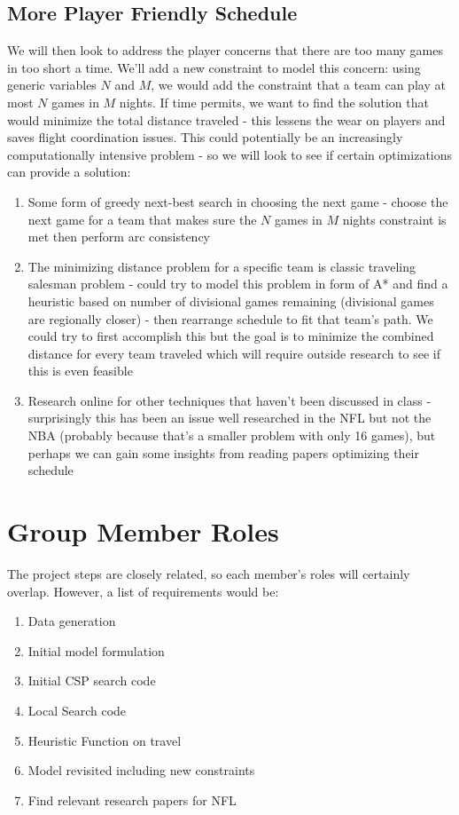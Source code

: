 \documentclass{article}
\begin{document}
	\subsection{More Player Friendly Schedule}
	We will then look to address the player concerns that there are too many games in too short a time. We'll add a new constraint to model this concern: using generic variables $N$ and $M$, we would add the constraint that a team can play at most $N$ games in $M$ nights.  If time permits, we want to find the solution that would minimize the total distance traveled - this lessens the wear on players and saves flight coordination issues. This could potentially be an increasingly computationally intensive problem - so we will look to see if certain optimizations can provide a solution:

	\begin{enumerate}
		\item Some form of greedy next-best search in choosing the next game - choose the next game for a team that makes sure the $N$ games in $M$ nights constraint is met then perform arc consistency
		\item The minimizing distance problem for a specific team is classic traveling salesman problem - could try to model this problem in form of A* and find a heuristic based on number of divisional games remaining (divisional games are regionally closer) - then rearrange schedule to fit that team's path. We could try to first accomplish this but the goal is to minimize the combined distance for every team traveled which will require outside research to see if this is even feasible
		\item Research online for other techniques that haven't been discussed in class - surprisingly this has been an issue well researched in the NFL but not the NBA (probably because that's a smaller problem with only 16 games), but perhaps we can gain some insights from reading papers optimizing their schedule
	\end{enumerate}

	\section{Group Member Roles}
	The project steps are closely related, so each member's roles will certainly overlap. However, a list of requirements would be:

	\begin{enumerate}
		\item Data generation
		\item Initial model formulation
		\item Initial CSP search code
		\item Local Search code
		\item Heuristic Function on travel
		\item Model revisited including new constraints
		\item Find relevant research papers for NFL
	\end{enumerate}
\end{document}
